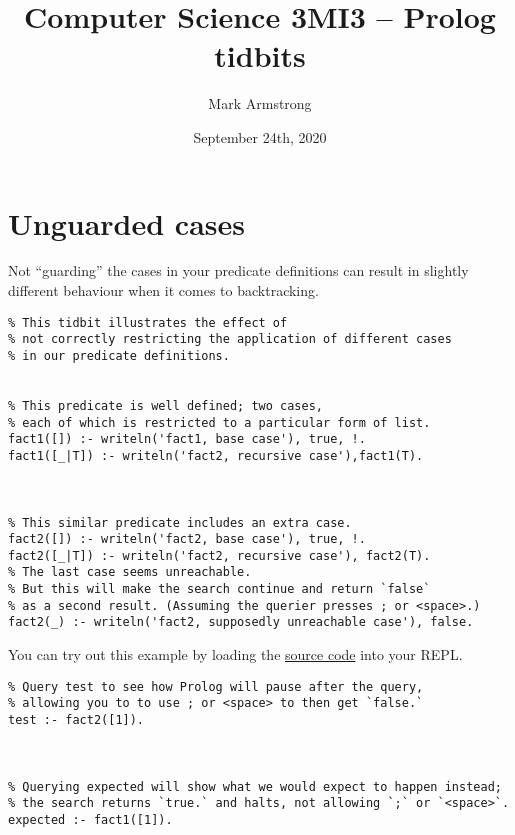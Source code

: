 \documentclass[11pt]{article}
\author{Mark Armstrong}
\date{September 24th, 2020}
\title{Computer Science 3MI3 – Prolog tidbits}
\begin{document}
\maketitle
\tableofcontents


\section*{Unguarded cases}
\label{sec:org81cb9b9}
Not “guarding” the cases in your predicate definitions
can result in slightly different behaviour when it comes to backtracking.
\begin{verbatim}
% This tidbit illustrates the effect of
% not correctly restricting the application of different cases
% in our predicate definitions.


% This predicate is well defined; two cases,
% each of which is restricted to a particular form of list.
fact1([]) :- writeln('fact1, base case'), true, !.
fact1([_|T]) :- writeln('fact2, recursive case'),fact1(T).



% This similar predicate includes an extra case.
fact2([]) :- writeln('fact2, base case'), true, !.
fact2([_|T]) :- writeln('fact2, recursive case'), fact2(T).
% The last case seems unreachable.
% But this will make the search continue and return `false`
% as a second result. (Assuming the querier presses ; or <space>.)
fact2(_) :- writeln('fact2, supposedly unreachable case'), false.
\end{verbatim}

You can try out this example by loading the \href{./src/unguarded-cases.pl}{source code} into your REPL.
\begin{verbatim}
% Query test to see how Prolog will pause after the query,
% allowing you to to use ; or <space> to then get `false.`
test :- fact2([1]).



% Querying expected will show what we would expect to happen instead;
% the search returns `true.` and halts, not allowing `;` or `<space>`.
expected :- fact1([1]).
\end{verbatim}
\end{document}
